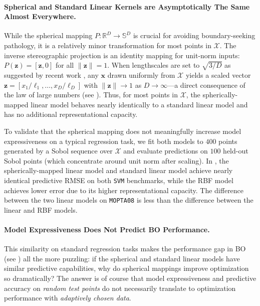 \documentclass[twoside]{article}
\theoremstyle{plain}
\theoremstyle{definition}
\begin{document}
\paragraph{Spherical and Standard Linear Kernels are Asymptotically The Same Almost Everywhere.}
While the spherical mapping $P: \mathbb{R}^D \rightarrow \mathbb{S}^D$ is crucial for avoiding boundary-seeking pathology, it is a relatively minor transformation for most points in $\mathcal{X}$.
The inverse stereographic projection is an identity mapping for unit-norm inputs: $P(\mathbf{z}) = [\mathbf{z}, 0]$ for all $\|\mathbf{z}\| = 1$.
When lengthscales are set to $\sqrt{3/D}$ as suggested by recent work \citep{hvarfner2024vanilla, xu2025standard}, any $\mathbf{x}$ drawn uniformly from $\mathcal{X}$ yields a scaled vector $\mathbf{z} = [x_1/\ell_1, \ldots, x_D/\ell_D]$ with $\|\mathbf{z}\| \to 1$ as $D \to \infty$—a direct consequence of the law of large numbers (see ).
Thus, for most points in $\mathcal{X}$, the spherically-mapped linear model behaves nearly identically to a standard linear model and has no additional representational capacity.

To validate that the spherical mapping does not meaningfully increase model expressiveness on a typical regression task, we fit both models to $400$ points generated by a Sobol sequence over $\mathcal{X}$ and evaluate predictions on $100$ held-out Sobol points (which concentrate around unit norm after scaling).
In , the spherically-mapped linear model and standard linear model achieve nearly identical predictive RMSE on both \texttt{SVM} benchmarks, while the RBF model achieves lower error due to its higher representational capacity. The difference between the two linear models on \texttt{MOPTA08} is less than the difference between the linear and RBF models.

\paragraph{Model Expressiveness Does Not Predict BO Performance.}
This similarity on standard regression tasks makes the performance gap in BO 
(see ) all the more puzzling: if the spherical and standard linear models have similar 
predictive capabilities, why do spherical mappings improve optimization so dramatically?
The answer is of course that
model expressiveness and predictive accuracy on \emph{random test points} do not necessarily translate 
to optimization performance with \emph{adaptively chosen data}.
\end{document}
